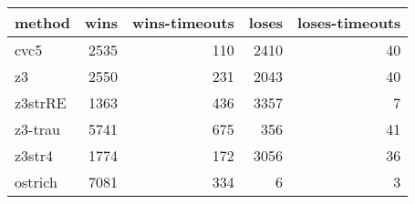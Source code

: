 \begin{tabular}{lrrrr}
\hline
 method   &   wins &   wins-timeouts &   loses &   loses-timeouts \\
\hline
 cvc5     &   2535 &             110 &    2410 &               40 \\
 z3       &   2550 &             231 &    2043 &               40 \\
 z3strRE  &   1363 &             436 &    3357 &                7 \\
 z3-trau  &   5741 &             675 &     356 &               41 \\
 z3str4   &   1774 &             172 &    3056 &               36 \\
 ostrich  &   7081 &             334 &       6 &                3 \\
\hline
\end{tabular}

